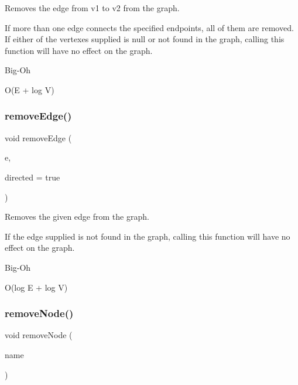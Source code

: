 Removes the edge from v1 to v2 from the graph. 

If more than one edge connects the specified endpoints, all of them are removed. If either of the vertexes supplied is null or not found in the graph, calling this function will have no effect on the graph. \begin{DoxyRefDesc}{Big-\/\+Oh}
\item[\mbox{\hyperlink{BigOh__BigOh000030}{Big-\/\+Oh}}]O(E + log V) \end{DoxyRefDesc}
\mbox{\label{classBasicGraphGen_a2c6bb1e8e2c18b7376504692f7baae62}} 
\subsubsection{\texorpdfstring{remove\+Edge()}{removeEdge()}\hspace{0.1cm}{\footnotesize\ttfamily [3/3]}}
{\footnotesize\ttfamily void remove\+Edge (\begin{DoxyParamCaption}\item[{Edge\+Gen$<$ V, E $>$ $\ast$}]{e,  }\item[{bool}]{directed = {\ttfamily true} }\end{DoxyParamCaption})}



Removes the given edge from the graph. 

If the edge supplied is not found in the graph, calling this function will have no effect on the graph. \begin{DoxyRefDesc}{Big-\/\+Oh}
\item[\mbox{\hyperlink{BigOh__BigOh000031}{Big-\/\+Oh}}]O(log E + log V) \end{DoxyRefDesc}
\mbox{\label{classGraph_a2d5f7ee89176144ed4c5c6b08a233aa6}} 
\subsubsection{\texorpdfstring{remove\+Node()}{removeNode()}\hspace{0.1cm}{\footnotesize\ttfamily [1/2]}}
{\footnotesize\ttfamily void remove\+Node (\begin{DoxyParamCaption}\item[{const std\+::string \&}]{name }\end{DoxyParamCaption})\hspace{0.3cm}{\ttfamily [inherited]}}



